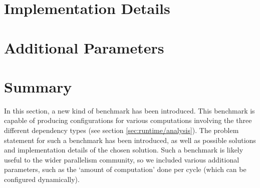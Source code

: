 \section{Implementation Details} \label{sec:parametric/implementation}

\section{Additional Parameters} \label{sec:parametric/additional-params}

\section{Summary} \label{sec:parametric/summary}
In this section, a new kind of benchmark has been introduced. This benchmark is capable of producing configurations for various computations involving the three different dependency types (see section \ref{sec:runtime/analysis}). The problem statement for such a benchmark has been introduced, as well as possible solutions and implementation details of the chosen solution. Such a benchmark is likely useful to the wider parallelism community, so we included various additional parameters, such as the `amount of computation' done per cycle (which can be configured dynamically).